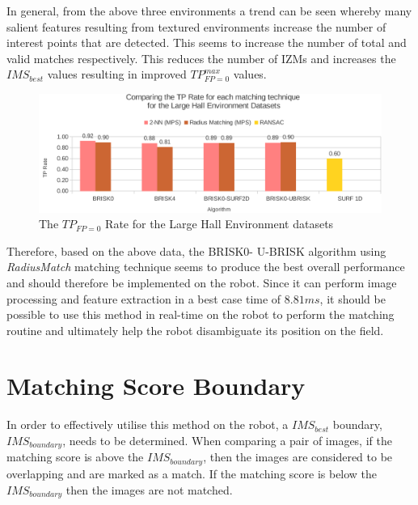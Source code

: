 \documentclass[11pt]{report}
\begin{document}
In general, from the above three environments a trend can be seen whereby many salient features resulting from textured environments increase the number of interest points that are detected. This seems to increase the number of total and valid matches respectively. This reduces the number of IZMs and increases the $IMS_{best}$ values resulting in improved $TP_{FP=0}^{max}$ values.\\

\begin{figure}
  \centering
    \includegraphics[width=1.0\textwidth]{../Drawings/Graphs/tp_rate_lh.pdf}
    \caption{The $TP_{FP=0}$ Rate for the Large Hall Environment datasets} 
    \label{fig:tp_rate_lh}
\end{figure}


Therefore, based on the above data, the BRISK0- U-BRISK algorithm using \textit{RadiusMatch} matching technique seems to produce the best overall performance and should therefore be implemented on the robot. Since it can perform image processing and feature extraction in a best case time of $8.81 ms$, it should be possible to use this method in real-time on the robot to perform the matching routine and ultimately help the robot disambiguate its position on the field.\\

\section{Matching Score Boundary}
\label{sec:matchingScoreBoundary}
In order to effectively utilise this method on the robot, a $IMS_{best}$ boundary, $IMS_{boundary}$, needs to be determined. When comparing a pair of images, if the matching score is above the $IMS_{boundary}$, then the images are considered to be overlapping and are marked as a match. If the matching score is below the $IMS_{boundary}$ then the images are not matched. \\
\end{document}
